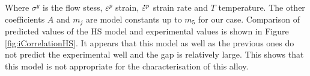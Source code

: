 \documentclass[twoside,english,1p,final,sort&compress]{elsarticle}
\theoremstyle{plain}
\newcommand{\mdot}[1]{\accentset{\mbox{\bfseries .}}{#1}}
\begin{document}
Where $\sigma^y$ is the flow stess, $\varepsilon^p$ strain, $\mdot{\varepsilon}^p$ strain rate and $T$ temperature. The other coefficients $A$ and $m_j$ are model constants up to $m_5$ for our case. Comparison of predicted values of the HS model and experimental values is shown in Figure \ref{fig:iCorrelationHS}. It appears that this model as well as the previous ones do not predict the experimental well and the gap is relatively large. This shows that this model is not appropriate for the characterisation of this alloy.
\begin{table}[h!]
\centering{}
\caption{Parameters' constants of Hansel and Spittel Model}
\end{table}
\end{document}
